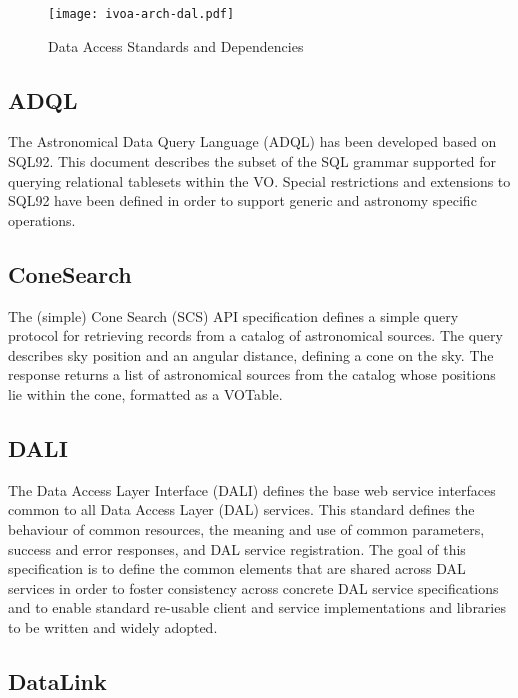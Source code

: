 \documentclass[11pt,letter]{ivoa}
\begin{document}
\begin{figure}[ht]
\centering
\texttt{[image: ivoa-arch-dal.pdf]}
\caption{Data Access Standards and Dependencies}
\label{fig:daldeps}
\end{figure}


\subsection{ADQL}

The Astronomical Data Query Language (ADQL) \citep{2023ivoa.spec.1215M}
has been developed based on SQL92. This document
describes the subset of the SQL grammar supported for querying
relational tablesets within the VO. Special restrictions and
extensions to SQL92 have been defined in order to support generic and
astronomy
specific operations. 

\subsection{ConeSearch}

The (simple) Cone Search (SCS) \citep{2008ivoa.specQ0222P} API
specification defines a simple query protocol for retrieving
records from a catalog of astronomical sources. The query describes sky
position and an
angular distance, defining a cone on the sky. The response returns a
list of astronomical
sources from the catalog whose positions lie within the cone, formatted
as a VOTable.

\subsection{DALI}
\label{dal:dali}

The Data Access Layer Interface (DALI) \citep{2017ivoa.spec.0517D}
defines the base web service interfaces common to all Data
Access Layer (DAL) services. This standard defines the behaviour of
common resources, the
meaning and use of common parameters, success and error responses, and
DAL service
registration. The goal of this specification is to define the common
elements that are
shared across DAL services in order to foster consistency across
concrete DAL service
specifications and to enable standard re-usable client and service
implementations and
libraries to be written and widely adopted. 

\subsection{DataLink}
\end{document}
